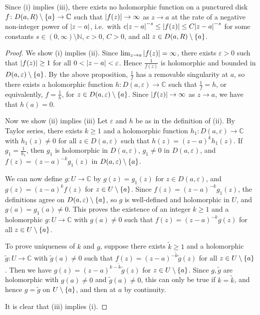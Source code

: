 \begin{remark}
	Since (i) implies (iii), there exists no holomorphic function on a punctured disk \( f \colon D(a,R) \setminus \qty{a} \to \mathbb C \) such that \( \abs{f(z)} \to \infty \) as \( z \to a \) at the rate of a negative non-integer power of \( \abs{z-a} \), i.e.\ with \( c\abs{z-a}^{-s} \leq \abs{f(z)} \leq C\abs{z-a}^{-s} \) for some constants \( s \in (0,\infty) \setminus \mathbb N \), \( c > 0 \), \( C > 0 \), and all \( z \in D(a,R) \setminus \qty{a} \).
\end{remark}
\begin{proof}
	We show (i) implies (ii).
	Since \( \lim_{z \to a} \abs{f(z)} = \infty \), there exists \( \varepsilon > 0 \) such that \( \abs{f(z)} \geq 1 \) for all \( 0 < \abs{z-a} < \varepsilon \).
	Hence \( \frac{1}{f(z)} \) is holomorphic and bounded in \( D(a,\varepsilon) \setminus \qty{a} \).
	By the above proposition, \( \frac{1}{f} \) has a removable singularity at \( a \), so there exists a holomorphic function \( h \colon D(a,\varepsilon) \to \mathbb C \) such that \( \frac{1}{f} = h \), or equivalently, \( f = \frac{1}{h} \), for \( z \in D(a,\varepsilon) \setminus \qty{a} \).
	Since \( \abs{f(z)} \to \infty \) as \( z \to a \), we have that \( h(a) = 0 \).

	Now we show (ii) implies (iii)
	Let \( \varepsilon \) and \( h \) be as in the definition of (ii).
	By Taylor series, there exists \( k \geq 1 \) and a holomorphic function \( h_1 \colon D(a,\varepsilon) \to \mathbb C \) with \( h_1(z) \neq 0 \) for all \( z \in D(a,\varepsilon) \) such that \( h(z) = (z-a)^k h_1(z) \).
	If \( g_1 = \frac{1}{h_1} \), then \( g_1 \) is holomorphic in \( D(a,\varepsilon) \), \( g_1 \neq 0 \) in \( D(a,\varepsilon) \), and \( f(z) = (z-a)^{-k} g_1(z) \) in \( D(a,\varepsilon) \setminus \qty{a} \).

	We can now define \( g \colon U \to \mathbb C \) by \( g(z) = g_1(z) \) for \( z \in D(a,\varepsilon) \), and \( g(z) = (z-a)^k f(z) \) for \( z \in U \setminus \qty{a} \).
	Since \( f(z) = (z-a)^{-k} g_1(z) \), the definitions agree on \( D(a,\varepsilon) \setminus \qty{a} \), so \( g \) is well-defined and holomorphic in \( U \), and \( g(a) = g_1(a) \neq 0 \).
	This proves the existence of an integer \( k \geq 1 \) and a holomorphic \( g \colon U \to \mathbb C \) with \( g(a) \neq 0 \) such that \( f(z) = (z-a)^{-k} g(z) \) for all \( z \in U \setminus \qty{a} \).

	To prove uniqueness of \( k \) and \( g \), suppose there exists \( \widetilde k \geq 1 \) and a holomorphic \( \widetilde g \colon U \to \mathbb C \) with \( \widetilde g(a) \neq 0 \) such that \( f(z) = (z-a)^{-\widetilde k} \widetilde g(z) \) for all \( z \in U \setminus \qty{a} \).
	Then we have \( g(z) = (z-a)^{k - \widetilde k} \widetilde g(z) \) for \( z \in U \setminus \qty{a} \).
	Since \( g, \widetilde g \) are holomorphic with \( g(a) \neq 0 \) and \( \widetilde g(a) \neq 0 \), this can only be true if \( k = \widetilde k \), and hence \( g = \widetilde g \) on \( U \setminus \qty{a} \), and then at \( a \) by continuity.

	It is clear that (iii) implies (i).
\end{proof}
